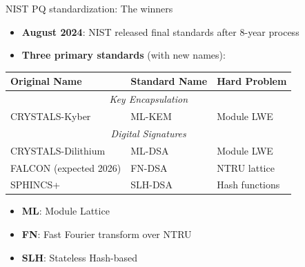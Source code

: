 \documentclass[aspectratio=169, lualatex]{beamer} %
\def\enrouge#1{\textcolor{rouge}{#1}}
\begin{document}
\begin{frame}{NIST PQ standardization: The winners}
	\begin{itemize}
		\item \textbf{August 2024}: NIST released final standards after 8-year process
		\item \textbf{Three primary standards} (with new names):
	\end{itemize}

	\begin{center}
		\begin{tabular}{|l|l|l|}
			\hline
			\textbf{Original Name} & \textbf{Standard Name} & \textbf{Hard Problem} \\
			\hline
			\hline
			\multicolumn{3}{|c|}{\textit{Key Encapsulation}}                        \\
			\hline
			CRYSTALS-Kyber         & ML-KEM                 & Module LWE            \\
			\hline
			\hline
			\multicolumn{3}{|c|}{\textit{Digital Signatures}}                       \\
			\hline
			CRYSTALS-Dilithium     & ML-DSA                 & Module LWE            \\
			FALCON  \enrouge{(expected 2026)}               & FN-DSA                 & NTRU lattice          \\
			SPHINCS+               & SLH-DSA                & Hash functions        \\
			\hline
		\end{tabular}
	\end{center}

	\begin{itemize}
		\item \textbf{ML}: Module Lattice
		\item \textbf{FN}: Fast Fourier transform over NTRU
		\item \textbf{SLH}: Stateless Hash-based
	\end{itemize}
\end{frame}
\end{document}
